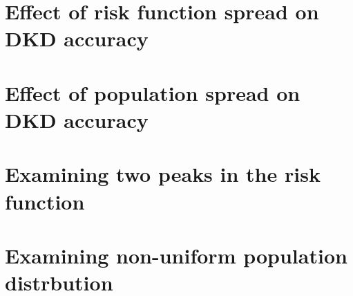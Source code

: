 \section{Effect of risk function spread on DKD accuracy}

\section{Effect of population spread on DKD accuracy}

\section{Examining two peaks in the risk function}

\section{Examining non-uniform population distrbution}

